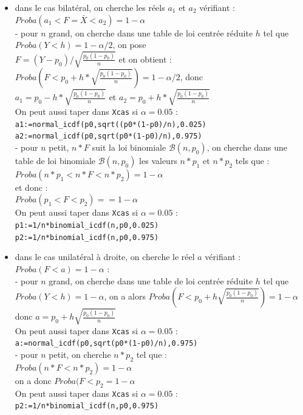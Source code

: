 \documentclass[a4paper,11pt]{book}
\begin{document}
\begin{itemize}
\item dans le cas bilat\'eral, on cherche les r\'eels 
$a_1$ et $a_2$ v\'erifiant :\\
$Proba(a_1<F=\bar X<a_2)=1-\alpha$\\
- pour $n$ grand, on cherche dans une table de loi centr\'ee r\'eduite $h$ tel 
que $Proba(Y<h)=1-\alpha/2$, on pose \\
$F=(Y-p_0)/\sqrt{\frac{p_0(1-p_0)}{n}}$ 
et on obtient :\\
$Proba(F<p_0+h*\sqrt{\frac{p_0(1-p_0)}{n}})=1-\alpha/2$, donc \\
$a_1=p_0-h*\sqrt{\frac{p_0(1-p_0)}{n}}$ et
$a_2=p_0+h*\sqrt{\frac{p_0(1-p_0)}{n}}$\\
On peut aussi taper dans {\tt Xcas} si $\alpha=0.05$ :\\
{\tt a1:=normal\_icdf(p0,sqrt((p0*(1-p0)/n),0.025)}\\
{\tt a2:=normal\_icdf(p0,sqrt(p0*(1-p0)/n),0.975)}\\
- pour $n$ petit, $n*F$ suit la loi binomiale $\mathcal B(n,p_0)$,
 on cherche dans une table de 
loi binomiale $\mathcal B(n,p_0)$ les valeurs $n*p_1$ et $n*p_2$ tels que :\\
$Proba( n*p_1<n*F<n*p_2)=1-\alpha$\\
et donc :\\
$Proba(p_1<F<p_2)==1-\alpha$\\
On peut aussi taper dans {\tt Xcas} si $\alpha=0.05$ :\\
{\tt p1:=1/n*binomial\_icdf(n,p0,0.025)}\\
{\tt p2:=1/n*binomial\_icdf(n,p0,0.975)}\\

\item  dans le cas unilat\'eral \`a droite, on cherche le r\'eel 
$a$ v\'erifiant :\\
$Proba(F<a)=1-\alpha$ :\\
- pour $n$ grand, on cherche dans une table de loi centr\'ee r\'eduite $h$ tel 
que $Proba(Y<h)=1-\alpha$, on a alors $Proba( F<p_0+h\sqrt{\frac{p_0(1-p_0)}{n}})=1-\alpha$ donc $a=p_0+h\sqrt{\frac{p_0(1-p_0)}{n}}$ \\
On peut aussi taper dans {\tt Xcas}  si $\alpha=0.05$ :\\
{\tt a:=normal\_icdf(p0,sqrt(p0*(1-p0)/n),0.975)}\\
- pour $n$ petit, on cherche $n*p_2$ tel que :\\
$Proba(n*F<n*p_2)=1-\alpha$\\
on a donc $Proba(F<p_2=1-\alpha$\\
On peut aussi taper dans {\tt Xcas}  si $\alpha=0.05$ :\\
{\tt p2:=1/n*binomial\_icdf(n,p0,0.975)}\\


\end{itemize}
\end{document}
